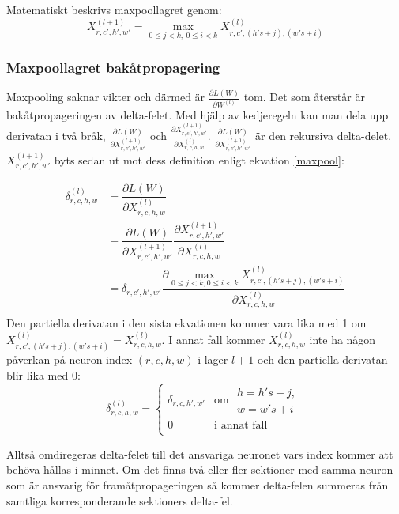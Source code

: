 \documentclass[a4paper,11pt,twoside]{article}
\newcommand*{\pd}[2]{\ensuremath{\dfrac{\partial #1}{\partial #2}}}
\newcommand*{\inpd}[2]{\ensuremath{\frac{\partial #1}{\partial #2}}}
\begin{document}
Matematiskt beskrivs maxpoollagret genom: \cite{cs231n} \cite{convmath}
\begin{equation}\label{maxpool}
X^{(l+1)}_{r,c',h',w'} = \underset{0 \leq j < k, \ 0 \leq i < k}{\max} X^{(l)}_{r,c',(h's+j),(w's+i)}
\end{equation}
\subsubsection{Maxpoollagret bakåtpropagering}
Maxpooling saknar vikter och därmed är $\inpd{L(W)}{W^{(l)}}$ tom. Det som återstår är bakåtpropageringen av delta-felet. Med hjälp av kedjeregeln kan man dela upp derivatan i två bråk, $\inpd{L(W)}{X^{(l+1)}_{r,c',h',w'}}$ och $\inpd{X^{(l+1)}_{r,c',h',w'}}{X^{(l)}_{r,c,h,w}}$. $\inpd{L(W)}{X^{(l+1)}_{r,c',h',w'}}$ är den rekursiva delta-delet. $X^{(l+1)}_{r,c',h',w'}$ byts sedan ut mot dess definition enligt ekvation \eqref{maxpool}: \cite{cs231n} \cite{convmath} \cite{webconv3}

\begin{equation}
\begin{split}
	\delta^{(l)}_{r,c,h,w}
		& = \pd{L(W)}{X^{(l)}_{r,c,h,w}} \\
		& = \pd{L(W)}{X^{(l+1)}_{r,c',h',w'}} \pd{X^{(l+1)}_{r,c',h',w'}}{X^{(l)}_{r,c,h,w}} \\
		& = \delta_{r,c',h',w'} \pd{\underset{0 \leq j < k,0 \leq i < k}{\max} X^{(l)}_{r,c',(h's+j),(w's+i)}}{X^{(l)}_{r,c,h,w}} \\
\end{split}
\end{equation}
Den partiella derivatan i den sista ekvationen kommer vara lika med 1 om $X^{(l)}_{r,c',(h's+j),(w's+i)} = X^{(l)}_{r,c,h,w}$. I annat fall kommer $X^{(l)}_{r,c,h,w}$ inte ha någon påverkan på neuron index ${(r,c,h,w)}$ i lager $l+1$ och den partiella derivatan blir lika med 0: \cite{cs231n} \cite{convmath} \cite{webconv3}
\begin{equation}
\delta^{(l)}_{r,c,h,w} = \begin{cases}
				\delta_{r,c,h',w'} & \mbox{om } \begin{split} h = h's+j, \\w = w's+i \end{split}\\
				0 & \mbox{i annat fall}\\
			\end{cases}
\end{equation}

Alltså omdiregeras delta-felet till det ansvariga neuronet vars index kommer att behöva hållas i minnet. Om det finns två eller fler sektioner med samma neuron som är ansvarig för framåtpropageringen så kommer delta-felen summeras från samtliga korresponderande sektioners delta-fel. \cite{cs231n} \cite{convmath} \cite{webconv3}
\end{document}
